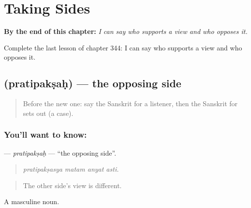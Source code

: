 
\chapter{Taking Sides}
\label{ch:sa-taking-sides}

\begin{chapteropening}
\textbf{By the end of this chapter:} \emph{I can say who supports a view and who opposes it.}

Complete the last lesson of chapter 344: I can say who supports a view and who opposes it.
\end{chapteropening}

\section[\texorpdfstring{\sk{प्रतिपक्षः} (pratipakṣaḥ)}{प्रतिपक्षः (pratipakṣaḥ)}]{ (pratipakṣaḥ) — the opposing side}

\label{lesson:SA-C344-pratipaksah}



\begin{quote}
Before the new one: say the Sanskrit for a listener, then the Sanskrit for sets out (a case).
\end{quote}

\subsection*{You'll want to know: }
\textbf{} — \emph{pratipakṣaḥ} — \textquotedblleft{}the opposing side\textquotedblright{}.

\begin{quote}
   
\end{quote}

\begin{quote}
\emph{pratipakṣasya matam anyat asti.}
\end{quote}

\begin{quote}
The other side's view is different.
\end{quote}

A masculine noun.

